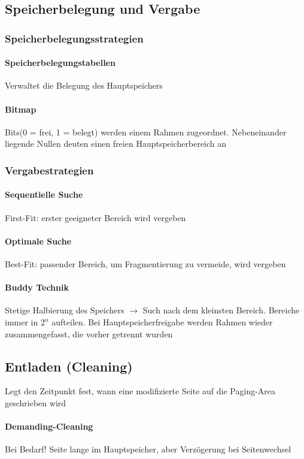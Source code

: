 \documentclass[11pt,a4paper,landscape]{article}
\begin{document}
\begin{multicols*}{3}
	\subsection{Speicherbelegung und Vergabe}
	\subsubsection{Speicherbelegungsstrategien}
	\paragraph{Speicherbelegungstabellen} Verwaltet die Belegung des Hauptspeichers
	\paragraph{Bitmap} Bits(0 = frei, 1 = belegt) werden einem Rahmen zugeordnet. Nebeneinander liegende Nullen deuten einen freien Hauptspeicherbereich an
	\subsubsection{Vergabestrategien}
	\paragraph{Sequentielle Suche} First-Fit: erster geeigneter Bereich wird vergeben
	\paragraph{Optimale Suche} Best-Fit: passender Bereich, um Fragmentierung zu vermeide, wird vergeben
	\paragraph{Buddy Technik} Stetige Halbierung des Speichers $\rightarrow$ Such nach dem kleinsten Bereich. Bereiche immer in $2^n$ aufteilen. Bei Hauptspeicherfreigabe werden Rahmen wieder zusammengefasst, die vorher getrennt wurden
	\subsection{Entladen (Cleaning)}
	Legt den Zeitpunkt fest, wann eine modifizierte Seite auf die Paging-Area geschrieben wird
	\paragraph{Demanding-Cleaning} Bei Bedarf! Seite lange im Hauptspeicher, aber Verzögerung bei Seitenwechsel

\end{multicols*}
\end{document}
